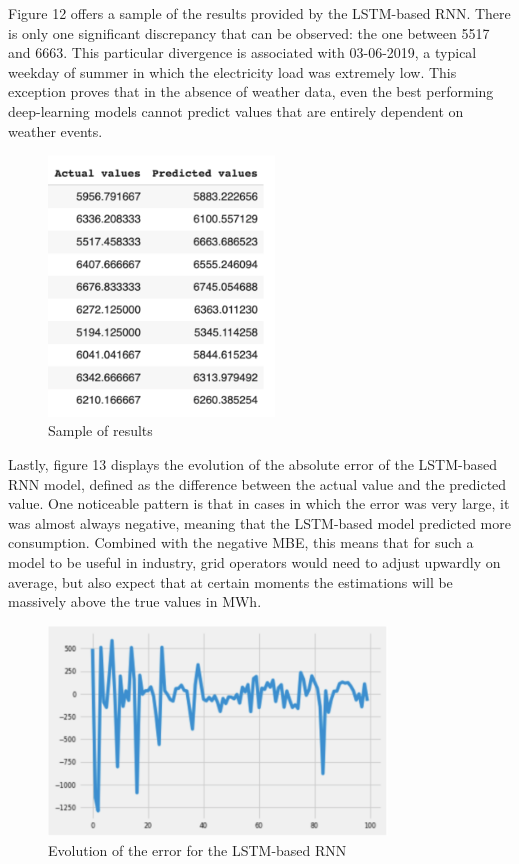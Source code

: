 \documentclass[10pt,twocolumn,letterpaper]{article}
\begin{document}
Figure 12 offers a sample of the results provided by the LSTM-based RNN. There is only one significant discrepancy that can be observed: the one between 5517 and 6663. This particular divergence is associated with 03-06-2019, a typical weekday of summer in which the electricity load was extremely low. This exception proves that in the absence of weather data, even the best performing deep-learning models cannot predict values that are entirely dependent on weather events. 
\begin{figure}[H]
\begin{center}
   \includegraphics[width=6cm]{final-report-latex/Sample.png}
   \caption{Sample of results}
   \end{center}
\end{figure}


Lastly, figure 13 displays the evolution of the absolute error of the LSTM-based RNN model, defined as the difference between the actual value and the predicted value. One noticeable pattern is that in cases in which the error was very large, it was almost always negative, meaning that the LSTM-based model predicted more consumption. Combined with the negative MBE, this means that for such a model to be useful in industry, grid operators would need to adjust upwardly on average, but also expect that at certain moments the estimations will be massively above the true values in MWh.

\begin{figure}[H]
\begin{center}
   \includegraphics[width=9cm]{final-report-latex/Error.png}
   \caption{Evolution of the error for the LSTM-based RNN}
   \end{center}
\end{figure}
\end{document}
